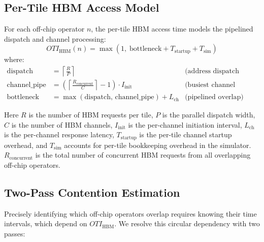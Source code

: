 \documentclass[10pt]{article}
\begin{document}
\subsection{Per-Tile HBM Access Model}

For each off-chip operator $n$, the per-tile HBM access time models the pipelined dispatch and channel processing:
\begin{equation}
    \mathit{OTI}_{\text{HBM}}(n) = \max\!\left(1,\; \text{bottleneck} + T_{\text{startup}} + T_{\text{sim}}\right)
\end{equation}
where:
\begin{align}
    \text{dispatch} &= \left\lceil\frac{R}{P}\right\rceil & \text{(address dispatch cycles)} \\
    \text{channel\_pipe} &= \left(\left\lceil\frac{R_{\text{concurrent}}}{C}\right\rceil - 1\right) \cdot I_{\text{init}} & \text{(busiest channel pipeline)} \\
    \text{bottleneck} &= \max(\text{dispatch},\, \text{channel\_pipe}) + L_{\text{ch}} & \text{(pipelined overlap)}
\end{align}

Here $R$ is the number of HBM requests per tile, $P$ is the parallel dispatch width, $C$ is the number of HBM channels, $I_{\text{init}}$ is the per-channel initiation interval, $L_{\text{ch}}$ is the per-channel response latency, $T_{\text{startup}}$ is the per-tile channel startup overhead, and $T_{\text{sim}}$ accounts for per-tile bookkeeping overhead in the simulator. $R_{\text{concurrent}}$ is the total number of concurrent HBM requests from all overlapping off-chip operators.

\subsection{Two-Pass Contention Estimation}

Precisely identifying which off-chip operators overlap requires knowing their time intervals, which depend on $\mathit{OTI}_{\text{HBM}}$. We resolve this circular dependency with two passes:
\end{document}
